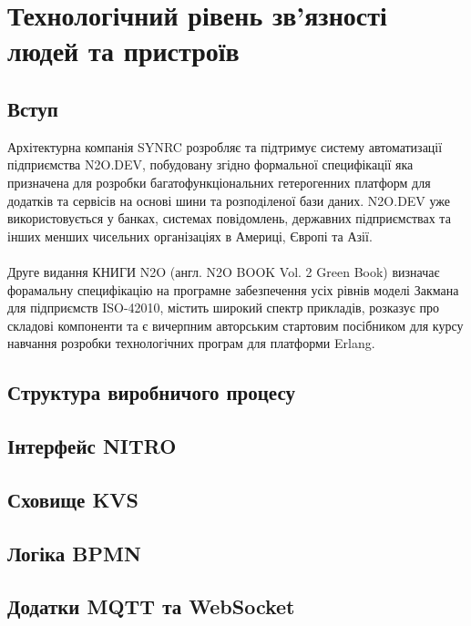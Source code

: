 \chapter{Технологічний рівень зв'язності людей та пристроїв}

\section{Вступ}

Архітектурна компанія SYNRC розробляє та підтримує систему автоматизації підприємства N2O.DEV,
побудовану згідно формальної специфікації яка призначена для розробки багатофункціональних
гетерогенних платформ для додатків та сервісів на основі шини та розподіленої бази даних.
N2O.DEV уже використовується у банках, системах повідомлень, державних підприємствах та
інших менших чисельних організаціях в Америці, Європі та Азії.
\\
\\
Друге видання КНИГИ N2O (англ. N2O BOOK Vol. 2 Green Book) визначає форамальну специфікацію
на програмне забезпечення усіх рівнів моделі Закмана для підприємств ISO-42010, містить
широкий спектр прикладів, розказує про складові компоненти та є вичерпним авторським
стартовим посібником для курсу навчання розробки технологічних програм для платформи Erlang.

\section{Структура виробничого процесу}

\section{Інтерфейс NITRO}

\section{Сховище KVS}

\section{Логіка BPMN}

\section{Додатки MQTT та WebSocket}


